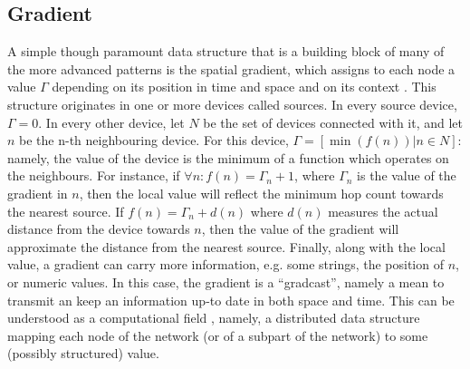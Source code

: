 \documentclass[12pt,a4paper,twoside,openright]{book}
\begin{document}
\subsection{Gradient}
\label{gradient}
A simple though paramount data structure that is a building block of many of the more advanced patterns is the spatial gradient, which assigns to each node a value $\varGamma$ depending on its position in time and space and on its context \cite{mamei2009acm,crf,VCMZ-TAAS2011}.
%
This structure originates in one or more devices called sources.
%
In every source device, $\varGamma=0$.
%
In every other device, let $N$ be the set of devices connected with it, and let $n$ be the n-th neighbouring device.
%
For this device, $\varGamma=[\min(f(n)) | n \in N]$: namely, the value of the device is the minimum of a function which operates on the neighbours.
%
For instance, if $ \forall n \colon f(n)=\varGamma_{n}+1$, where $\varGamma_{n}$ is the value of the gradient in $n$, then the local value will reflect the minimum hop count towards the nearest source.
%
If $f(n) = \varGamma_{n} +d(n)$ where $d(n)$ measures the actual distance from the device towards $n$, then the value of the gradient will approximate the distance from the nearest source.
%
Finally, along with the local value, a gradient can carry more information, e.g. some strings, the position of $n$, or numeric values.
%
In this case, the gradient is a ``gradcast'', namely a mean to transmit an keep an information up-to date in both space and time.
%
This can be understood as a computational field \cite{SpatialIGI2013,mamei2009acm,VCMZ-TAAS2011}, namely, a distributed data structure mapping each node of the network (or of a subpart of the network) to some (possibly structured) value.
\end{document}
